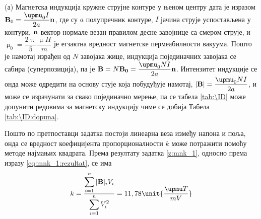 (а) Магнетска индукција кружне струјне контуре у њеном центру дата је изразом ${\bf B}_0 = \dfrac{\upmu_0 I}{2a} {\bf n}$, где су 
$a$ полупречник контуре, $I$ јачина струје успостављена у контури, ${\bf n}$ вектор нормале везан правилом десне завојнице са 
смером струје, и $\upmu_0 = \dfrac{2\uppi}{5} \unit{\dfrac{\upmu H}{m}}$ је егзактна вредност магнетске пермеабилности вакуума.
Пошто је намотај израђен од $N$ завојака жице, индукција појединачних завојака се сабира (суперпозиција), па је 
${\bf B} = N {\bf B_0} = \dfrac{\upmu_0 N I}{2a} {\bf n}$. Интензитет индукције се онда може одредити на основу 
стује која побудуђује намотај, 
$|{\bf B}| = \dfrac{\upmu_0 N I}{2a}$, и може се израчунати за свако појединачно мерење, па се табела 
\eqref{tab:\ID} може допунити редовима за магнетску индукцију чиме се добија Табела \ref{tab:\ID:dopuna}.

Пошто по претпоставци задатка постоји линеарна веза између напона и поља, онда се вредност коефицијента пропорционалности $k$ 
може потражити помоћу методе најмањих квадрата. Према резултату задатка \ref{z:mnk_1}, односно према изразу 
\eqref{eq:mnk_1:rezultat}, се има
\begin{equation}
    k = \dfrac{\displaystyle
        \sum_{i = 1}^n |{\bf B}|_i V_i
     }{\displaystyle
        \sum_{i = 1}^n V_i^2
     }
     = 11,78 \unit{\dfrac{\upmu T}{
        mV}}
\end{equation}


